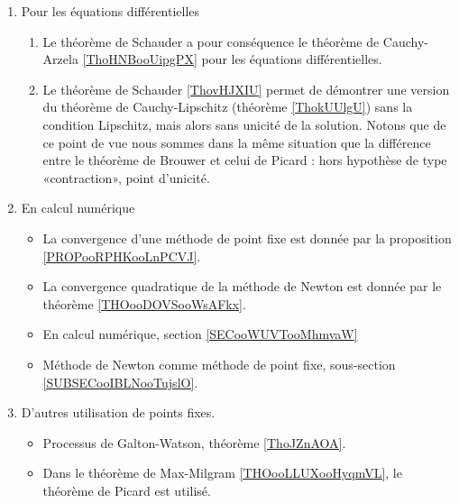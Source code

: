 \begin{enumerate}
\item Pour les équations différentielles
    \begin{enumerate}
        \item 
            Le théorème de Schauder a pour conséquence le théorème de Cauchy-Arzela \ref{ThoHNBooUipgPX} pour les équations différentielles.
        \item
            Le théorème de Schauder \ref{ThovHJXIU} permet de démontrer une version du théorème de Cauchy-Lipschitz (théorème \ref{ThokUUlgU}) sans la condition Lipschitz, mais alors sans unicité de la solution. Notons que de ce point de vue nous sommes dans la même situation que la différence entre le théorème de Brouwer et celui de Picard : hors hypothèse de type «contraction», point d'unicité.
    \end{enumerate}
\item
    En calcul numérique
    \begin{itemize}
        \item
            La convergence d'une méthode de point fixe est donnée par la proposition \ref{PROPooRPHKooLnPCVJ}.
        \item
            La convergence quadratique de la méthode de Newton est donnée par le théorème \ref{THOooDOVSooWsAFkx}.
        \item
            En calcul numérique, section \ref{SECooWUVTooMhmvaW}
        \item
            Méthode de Newton comme méthode de point fixe, sous-section \ref{SUBSECooIBLNooTujslO}.
    \end{itemize}

\item
    D'autres utilisation de points fixes.
\begin{itemize}
    \item
        Processus de Galton-Watson, théorème \ref{ThoJZnAOA}.
    \item 
        Dans le théorème de Max-Milgram \ref{THOooLLUXooHyqmVL}, le théorème de Picard est utilisé.
\end{itemize}
\end{enumerate}

